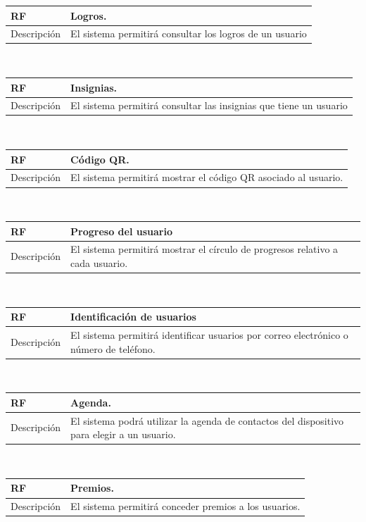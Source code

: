 \documentclass[twoside]{report}
\newcommand\addrow[2]{#1 &#2\\ }
\newcommand\addheading[2]{#1 &#2\\ \hline}
\newcommand\tabularhead{\begin{tabular}{lp{0.7\textwidth}}
\hline
}
\newenvironment{req}{\tabularhead}
{\hline\end{tabular}}
\begin{document}
\begin{req}
	\addheading{\textbf{RF\arabic{functionalRequirements}}}{Logros.}
	\addrow{Descripción}{El sistema permitirá consultar los logros de un usuario}
\end{req}\\

\begin{req}
	\addheading{\textbf{RF\arabic{functionalRequirements}}}{Insignias.}
	\addrow{Descripción}{El sistema permitirá consultar las insignias que tiene un usuario}
\end{req}\\

\begin{req}
	\addheading{\textbf{RF\arabic{functionalRequirements}}}{Código QR.}
	\addrow{Descripción}{El sistema permitirá mostrar el código QR asociado al usuario.}
\end{req}\\

\begin{req}
	\addheading{\textbf{RF\arabic{functionalRequirements}}}{Progreso del usuario}
	\addrow{Descripción}{El sistema permitirá mostrar el círculo de progresos relativo a cada usuario.}
\end{req}\\

\begin{req}
	\addheading{\textbf{RF\arabic{functionalRequirements}}}{Identificación de usuarios}
	\addrow{Descripción}{El sistema permitirá identificar usuarios por correo electrónico o número de teléfono.}
\end{req}\\

\begin{req}
	\addheading{\textbf{RF\arabic{functionalRequirements}}}{Agenda.}
	\addrow{Descripción}{El sistema podrá utilizar la agenda de contactos del dispositivo para elegir a un usuario.}
\end{req}\\

\begin{req}
	\addheading{\textbf{RF\arabic{functionalRequirements}}}{Premios.}
	\addrow{Descripción}{El sistema permitirá conceder premios a los usuarios.}
\end{req}\\
\end{document}
